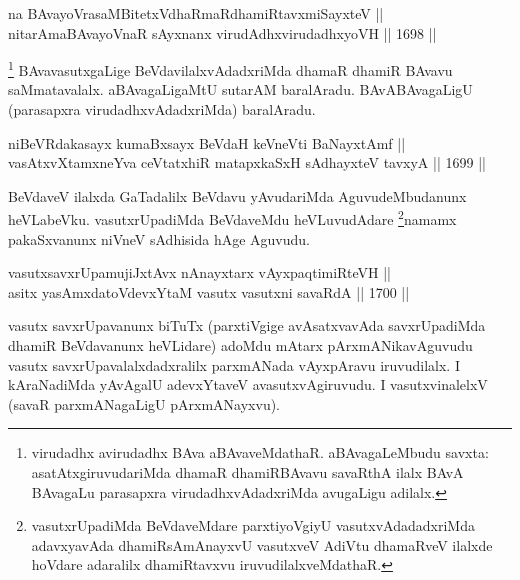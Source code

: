 
\begin{shl}
na BAvayoVrasaMBitetxVdhaRmaRdhamiRtavxmiSayxteV || \\
nitarAmaBAvayoVnaR sAyxnanx virudAdhxvirudadhxyoVH ||  1698 ||  
\end{shl}

\begin{artha}
\footnote{virudadhx avirudadhx BAva aBAvaveMdathaR. aBAvagaLeMbudu savxta: asatAtxgiruvudariMda dhamaR dhamiRBAvavu savaRthA ilalx BAvA BAvagaLu parasapxra virudadhxvAdadxriMda avugaLigu adilalx.}
BAvavasutxgaLige BeVdavilalxvAdadxriMda dhamaR dhamiR BAvavu saMmatavalalx. aBAvagaLigaMtU sutarAM baralAradu. BAvABAvagaLigU (parasapxra virudadhxvAdadxriMda) baralAradu.
\end{artha}

\begin{shl}
niBeVRdakasayx kumaBxsayx BeVdaH keVneVti BaNayxtAmf || \\
vasAtxvXtamxneYva ceVtatxhiR matapxkaSxH sAdhayxteV tavxyA ||  1699 ||  
\end{shl}

\begin{artha}
BeVdaveV ilalxda GaTadalilx BeVdavu yAvudariMda AguvudeMbudanunx heVLabeVku. vasutxrUpadiMda BeVdaveMdu heVLuvudAdare \footnote{vasutxrUpadiMda BeVdaveMdare parxtiyoVgiyU vasutxvAdadadxriMda adavxyavAda dhamiRsAmAnayxvU vasutxveV AdiVtu dhamaRveV ilalxde hoVdare adaralilx dhamiRtavxvu iruvudilalxveMdathaR.}namamx pakaSxvanunx niVneV sAdhisida hAge Aguvudu.
\end{artha}

\begin{shl}
vasutxsavxrUpamujiJxtAvx nAnayxtarx vAyxpaqtimiRteVH || \\
asitx yasAmxdatoV\s devxYtaM vasutx vasutxni savaRdA ||  1700 ||  
\end{shl}

\begin{artha}
vasutx savxrUpavanunx biTuTx (parxtiVgige avAsatxvavAda savxrUpadiMda dhamiR BeVdavanunx heVLidare) adoMdu mAtarx pArxmANikavAguvudu vasutx savxrUpavalalxdadxralilx parxmANada vAyxpAravu iruvudilalx. I kAraNadiMda yAvAgalU adevxYtaveV avasutxvAgiruvudu. I vasutxvinalelxV (savaR parxmANagaLigU pArxmANayxvu).
\end{artha}

